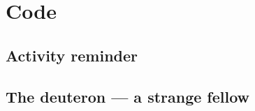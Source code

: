 \appendix
\singlespacing
\section{Code}
\subsection*{Activity reminder}


\subsection*{The deuteron --- a strange fellow}
